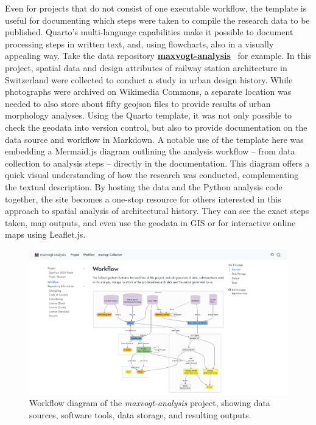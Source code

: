 \documentclass[final]{anthology-ch} %
\begin{document}
Even for projects that do not consist of one executable workflow, the template is useful for documenting which steps were taken to compile the research data to be published. Quarto's multi-language capabilities make it possible to document processing steps in written text, and, using flowcharts, also in a visually appealing way. Take the data repository \href{https://mtwente.github.io/maxvogt-analysis}{\textbf{maxvogt-analysis}}~\cite{twente2024} for example. In this project, spatial data and design attributes of railway station architecture in Switzerland were collected to conduct a study in urban design history. While photographs were archived on Wikimedia Commons, a separate location was needed to also store about fifty geojson files to provide results of urban morphology analyses. Using the Quarto template, it was not only possible to check the geodata into version control, but also to provide documentation on the data source and workflow in Markdown. A notable use of the template here was embedding a Mermaid.js diagram outlining the analysis workflow -- from data collection to analysis steps -- directly in the documentation. This diagram offers a quick visual understanding of how the research was conducted, complementing the textual description. By hosting the data and the Python analysis code together, the site becomes a one-stop resource for others interested in this approach to spatial analysis of architectural history. They can see the exact steps taken, map outputs, and even use the geodata in GIS or for interactive online maps using Leaflet.js.

\begin{figure}[t!]
  \centering
  \includegraphics[width=0.9\linewidth]{images/maxvogt_analysis.png}
  \caption{Workflow diagram of the \emph{maxvogt-analysis} project, showing data sources, software tools, data storage, and resulting outputs.}
  \label{fig-max-vogt}
\end{figure}
\end{document}
